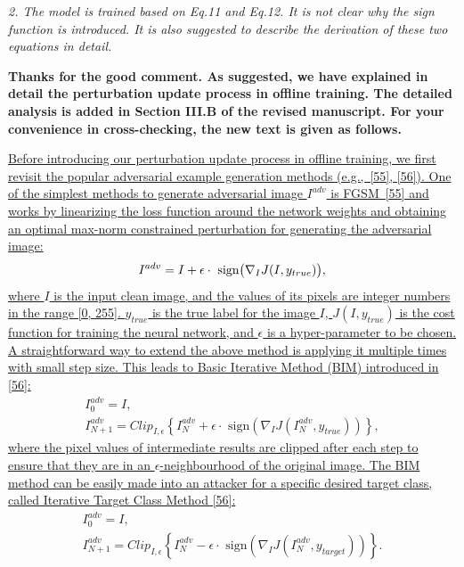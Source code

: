\documentclass[12pt]{article}
\newcommand{\eg}{e.g.}
\begin{document}
\textit{2. The model is trained based on Eq.11 and Eq.12. It is not clear why the sign function is introduced. It is also suggested to describe the derivation of these two equations in detail.}

\textbf{Thanks for the good comment. As suggested, we have explained in detail the perturbation update process in offline training.
The detailed analysis is added in Section III.B of the revised manuscript.
For your convenience in cross-checking, the new text is given as follows.}

\uline{Before introducing our perturbation update process in offline training, we first revisit the popular adversarial example generation methods (\eg,~[55], [56]). One of the simplest methods to generate adversarial image $I^{adv}$ is FGSM~[55] and works by linearizing the loss function around the network weights and obtaining an optimal max-norm constrained perturbation for generating the adversarial image:}
\begin{equation}
    I^{adv} = I + \epsilon \cdot \text{ sign} \bigl( \nabla_I J(I, y_{true})  \bigr),
    \vspace{-0.1cm}
\end{equation}
\uline{where $I$ is the input clean image, and the values of its pixels are integer numbers in the range [0, 255]. $y_{true}$ is the true label for the image $I$, $J(I, y_{true})$ is the cost function for training the neural network, and $\epsilon$ is a hyper-parameter to be chosen. A straightforward way to extend the above method is applying it multiple times with small step size. This leads to Basic Iterative Method (BIM) introduced in [56]:}
\begin{equation}
    \begin{gathered}
        I_0^{adv} = I, \\
        I_{N+1}^{adv} = Clip_{I, \epsilon}\left\{I_N^{adv}+\epsilon \cdot \text{ sign}(\nabla_I J(I_N^{adv},y_{true}))\right\},
    \end{gathered}
\end{equation}
\uline{where the pixel values of intermediate results are clipped after each step to ensure that they are in
an $\epsilon$-neighbourhood of the original image. The BIM method can be easily made into an attacker for a specific desired target class, called Iterative Target Class Method [56]:}
\begin{equation}
  \begin{gathered}
      I_0^{adv} = I,\\
      I_{N+1}^{adv} = Clip_{I, \epsilon}\left\{I_N^{adv}-\epsilon \cdot \text{ sign}(\nabla_I J(I_N^{adv},y_{target}))\right\}.
  \end{gathered}
  \label{equ:itcm}
\end{equation}
\end{document}
